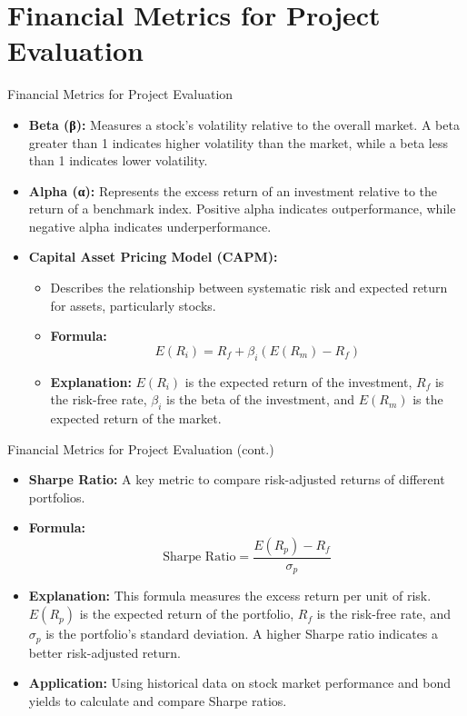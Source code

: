 \documentclass{beamer}
\begin{document}
\section{Financial Metrics for Project Evaluation}
\begin{frame}{Financial Metrics for Project Evaluation}
    \begin{itemize}
        \item \textbf{Beta (β):} Measures a stock's volatility relative to the overall market. A beta greater than 1 indicates higher volatility than the market, while a beta less than 1 indicates lower volatility.
        \item \textbf{Alpha (α):} Represents the excess return of an investment relative to the return of a benchmark index. Positive alpha indicates outperformance, while negative alpha indicates underperformance.
        \item \textbf{Capital Asset Pricing Model (CAPM):}
        \begin{itemize}
            \item Describes the relationship between systematic risk and expected return for assets, particularly stocks.
            \item \textbf{Formula:}
            \begin{equation*}
                E(R_i) = R_f + \beta_i (E(R_m) - R_f)
            \end{equation*}
            \item \textbf{Explanation:} \( E(R_i) \) is the expected return of the investment, \( R_f \) is the risk-free rate, \( \beta_i \) is the beta of the investment, and \( E(R_m) \) is the expected return of the market.
        \end{itemize}
    \end{itemize}
\end{frame}

\begin{frame}{Financial Metrics for Project Evaluation (cont.)}
    \begin{itemize}
        \item \textbf{Sharpe Ratio:} A key metric to compare risk-adjusted returns of different portfolios.
        \item \textbf{Formula:}
        \begin{equation*}
            \text{Sharpe Ratio} = \frac{E(R_p) - R_f}{\sigma_p}
        \end{equation*}
        \item \textbf{Explanation:} This formula measures the excess return per unit of risk. \( E(R_p) \) is the expected return of the portfolio, \( R_f \) is the risk-free rate, and \( \sigma_p \) is the portfolio's standard deviation. A higher Sharpe ratio indicates a better risk-adjusted return.
        \item \textbf{Application:} Using historical data on stock market performance and bond yields to calculate and compare Sharpe ratios.
    \end{itemize}
\end{frame}
\end{document}
